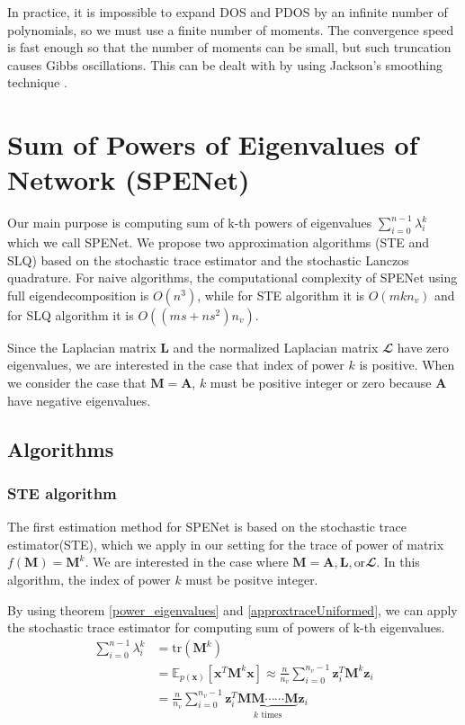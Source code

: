 \documentclass[senior,final,11pt]{iscs-thesis}
\begin{document}
In practice, it is impossible to expand DOS and PDOS by an infinite number of polynomials, so we must use a finite number of moments. The convergence speed is fast enough so that the number of moments can be small, but such truncation causes Gibbs oscillations. This can be dealt with by using Jackson's smoothing technique \cite{jackson1911genauigkeit,dong2019network}.



\chapter{Sum of Powers of Eigenvalues of Network (SPENet)}
Our main purpose is computing sum of k-th powers of eigenvalues $\sum_{i=0}^{n-1} \lambda_i^k$ which we call SPENet. We propose two approximation algorithms (STE and SLQ) based on the stochastic trace estimator and the stochastic Lanczos quadrature. For naive algorithms, the computational complexity of SPENet using full eigendecomposition is $O(n^3)$, while for STE algorithm it is $O(m k n_v)$ and for SLQ algorithm it is $O((ms + ns^2) n_v)$.

Since the Laplacian matrix ${\mathbf L}$ and the normalized Laplacian matrix ${\mathbfcal L}$ have zero eigenvalues, we are interested in the case that index of power $k$ is positive. When we consider the case that ${\mathbf M} = {\mathbf A}$, $k$ must be positive integer or zero because ${\mathbf A}$ have negative eigenvalues.


\section{Algorithms}
\subsection{STE algorithm}
The first estimation method for SPENet is based on the stochastic trace estimator(STE), which we apply in our setting for the trace of power of matrix $f({\mathbf M})={\mathbf M}^k$. We are interested in the case where ${\mathbf M} = {\mathbf A}, {\mathbf L}, \text{or} {\mathbfcal L}$. In this algorithm, the index of power $k$ must be positve integer.

By using theorem \ref{power_eigenvalues} and \ref{approxtraceUniformed}, we can apply the stochastic trace estimator for computing sum of powers of k-th eigenvalues.
\begin{align}
    \sum_{i=0}^{n-1} \lambda_i^k &= \mathrm{tr}({\mathbf M}^k)  \nonumber\\
    &= \mathbb{E}_{p(\mathbf{x})}[\mathbf{x}^{T}{\mathbf M}^k \mathbf{x}] \approx \frac{n}{n_v}\sum_{i=0}^{n_v-1} \mathbf{z}_i^{T}{\mathbf M}^k\mathbf{z}_i \\
    &= \frac{n}{n_v}\sum_{i=0}^{n_v-1} \mathbf{z}_i^{T} \underbrace{{\mathbf M}{\mathbf M} \cdots \cdots {\mathbf M}}_{k \text{ times}} \mathbf{z}_i
\end{align}
\end{document}
